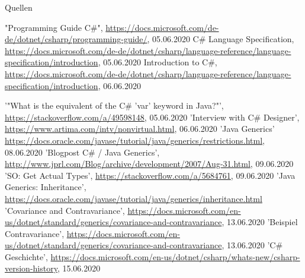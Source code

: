 \documentclass[11pt]{beamer}
\begin{document}
\begin{frame}{Quellen}
\begin{thebibliography}{99}
\fontsize{6pt}{7.2}\selectfont
	"Programming Guide C\#", \url{https://docs.microsoft.com/de-de/dotnet/csharp/programming-guide/}, 05.06.2020
	 C\# Language Specification, \url{https://docs.microsoft.com/de-de/dotnet/csharp/language-reference/language-specification/introduction}, 05.06.2020
   Introduction to C\#, \url{https://docs.microsoft.com/de-de/dotnet/csharp/language-reference/language-specification/introduction}, 06.06.2020

 '"What is the equivalent of the C\# 'var' keyword in Java?"', 
 \url{https://stackoverflow.com/a/49598148}, 05.06.2020
 'Interview with C\# Designer', \url{https://www.artima.com/intv/nonvirtual.html}, 06.06.2020
  'Java Generics' \url{https://docs.oracle.com/javase/tutorial/java/generics/restrictions.html}, 08.06.2020
  'Blogpost C\# / Java Generics', \url{http://www.jprl.com/Blog/archive/development/2007/Aug-31.html}, 09.06.2020
  'SO: Get Actual Types', \url{https://stackoverflow.com/a/5684761}, 09.06.2020
  'Java Generics: Inheritance', \url{https://docs.oracle.com/javase/tutorial/java/generics/inheritance.html}
  'Covariance and Contravariance', \url{https://docs.microsoft.com/en-us/dotnet/standard/generics/covariance-and-contravariance}, 13.06.2020
  'Beispiel Contravariance', \url{https://docs.microsoft.com/en-us/dotnet/standard/generics/covariance-and-contravariance}, 13.06.2020
 'C\# Geschichte', \url{https://docs.microsoft.com/en-us/dotnet/csharp/whats-new/csharp-version-history}, 15.06.2020
\end{thebibliography}
\end{frame}
\end{document}
